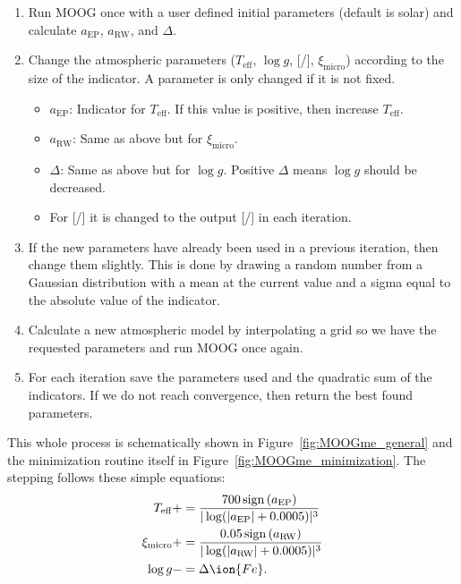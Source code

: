 \documentclass{aa}
\DeclareMathOperator{\sign}{sign}
\begin{document}
\begin{enumerate}
    \item Run MOOG once with a user defined initial parameters (default is
          solar) and calculate $a_\mathrm{EP}$, $a_\mathrm{RW}$, and
          $\Delta$.
    \item Change the atmospheric parameters ($T_\mathrm{eff}$, $\log g$,
          [/], $\xi_\mathrm{micro}$) according to the size of the
          indicator. A parameter is only changed if it is not fixed.
    \begin{itemize}
        \item $a_\mathrm{EP}$: Indicator for $T_\mathrm{eff}$. If this value
              is positive, then increase $T_\mathrm{eff}$.
        \item $a_\mathrm{RW}$: Same as above but for $\xi_\mathrm{micro}$.
        \item $\Delta$: Same as above but for $\log g$. Positive
              $\Delta$ means $\log g$ should be decreased.
        \item For [/] it is changed to the output [/]
              in each iteration.
    \end{itemize}
    \item If the new parameters have already been used in a previous iteration,
          then change them slightly. This is done by drawing a random number from
          a Gaussian distribution with a mean at the current value and a sigma
          equal to the absolute value of the indicator.
    \item Calculate a new atmospheric model by interpolating a grid so we have
          the requested parameters and run MOOG once again.
    \item For each iteration save the parameters used and the quadratic sum of
          the indicators. If we do not reach convergence, then return the best
          found parameters.
\end{enumerate}
This whole process is schematically shown in Figure~\ref{fig:MOOGme_general}
and the minimization routine itself in Figure~\ref{fig:MOOGme_minimization}.
The stepping follows these simple equations:
\begin{align}
    T_\mathrm{eff}     &+= \frac{700\sign{(a_\mathrm{EP})}}{|\log(|a_\mathrm{EP}|+0.0005)|^3} \\
    \xi_\mathrm{micro} &+= \frac{0.05\sign{(a_\mathrm{RW})}}{|\log(|a_\mathrm{RW}|+0.0005)|^3} \\
    \log g             &-= \Delta\ion{Fe}.
\end{align}
\end{document}

